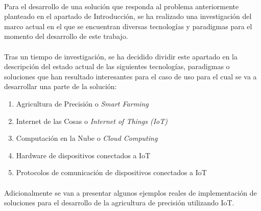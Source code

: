 \documentclass[../../memoria.tex]{subfiles}
\begin{document}
\paragraph{}
Para el desarrollo de una solución que responda al problema anteriormente planteado en el apartado de Introducción, se ha realizado una investigación del marco actual en el que se encuentran diversas tecnologías y paradigmas para el momento del desarrollo de este trabajo.

\paragraph{}
Tras un tiempo de investigación, se ha decidido dividir este apartado en la descripción del estado actual de las siguientes tecnologías, paradigmas o soluciones que han resultado interesantes para el caso de uso para el cual se va a desarrollar una parte de la solución:

\begin{enumerate}
    \item Agricultura de Precisión o \textit{Smart Farming}
    \item Internet de las Cosas o \textit{Internet of Things (IoT)}
    \item Computación en la Nube o \textit{Cloud Computing}
    \item Hardware de dispositivos conectados a IoT
    \item Protocolos de comunicación de dispositivos conectados a IoT
\end{enumerate}

\paragraph{}
Adicionalmente se van a presentar algunos ejemplos reales de implementación de soluciones para el desarrollo de la agricultura de precisión utilizando IoT.
\end{document}
